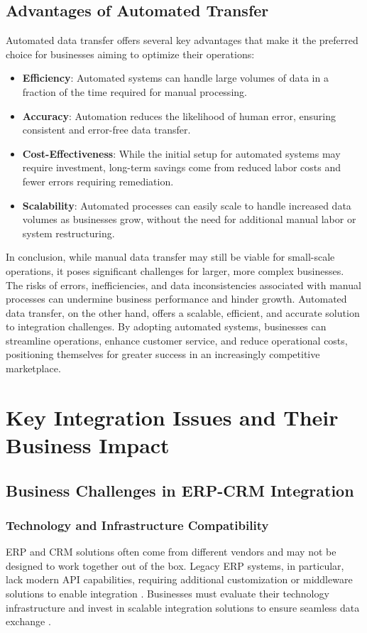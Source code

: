 \subsection{Advantages of Automated Transfer}

Automated data transfer offers several key advantages that make it the preferred choice for businesses aiming to optimize their operations:

\begin{itemize}
    \item \textbf{Efficiency}: Automated systems can handle large volumes of data in a fraction of the time required for manual processing.
    \item \textbf{Accuracy}: Automation reduces the likelihood of human error, ensuring consistent and error-free data transfer.
    \item \textbf{Cost-Effectiveness}: While the initial setup for automated systems may require investment, long-term savings come from reduced labor costs and fewer errors requiring remediation.
    \item \textbf{Scalability}: Automated processes can easily scale to handle increased data volumes as businesses grow, without the need for additional manual labor or system restructuring.
\end{itemize}

In conclusion, while manual data transfer may still be viable for small-scale operations, it poses significant challenges for larger, more complex businesses. The risks of errors, inefficiencies, and data inconsistencies associated with manual processes can undermine business performance and hinder growth. Automated data transfer, on the other hand, offers a scalable, efficient, and accurate solution to integration challenges. By adopting automated systems, businesses can streamline operations, enhance customer service, and reduce operational costs, positioning themselves for greater success in an increasingly competitive marketplace.

\section{Key Integration Issues and Their Business Impact}

\subsection{Business Challenges in ERP-CRM Integration}

\subsubsection{Technology and Infrastructure Compatibility}
ERP and CRM solutions often come from different vendors and may not be designed to work together out of the box. Legacy ERP systems, in particular, lack modern API capabilities, requiring additional customization or middleware solutions to enable integration \cite{shaul2013}. Businesses must evaluate their technology infrastructure and invest in scalable integration solutions to ensure seamless data exchange \cite{hendricks2007}.

